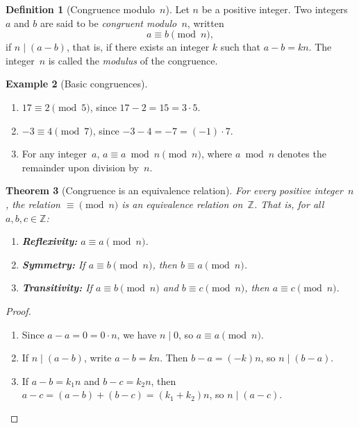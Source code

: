 \documentclass[12pt,a4paper,openany]{book}
\theoremstyle{definition}
\newtheorem{definition}{Definition}[chapter]
\newtheorem{example}[definition]{Example}
\theoremstyle{plain}
\newtheorem{theorem}[definition]{Theorem}
\theoremstyle{remark}
\newcommand{\Z}{\mathbb{Z}}
\begin{document}
\begin{definition}[Congruence modulo~$n$]
\label{def:congruence}
Let $n$ be a positive integer.  Two integers $a$ and $b$ are said to be
\emph{congruent modulo~$n$}, written
\[
  a \equiv b \pmod{n},
\]
if $n \mid (a - b)$, that is, if there exists an integer $k$ such that
$a - b = kn$.  The integer~$n$ is called the \emph{modulus}
of the congruence.
\end{definition}

\begin{example}[Basic congruences]
\label{ex:basic-cong}
\leavevmode
\begin{enumerate}[label=(\roman*)]
  \item $17 \equiv 2 \pmod{5}$, since $17 - 2 = 15 = 3 \cdot 5$.
  \item $-3 \equiv 4 \pmod{7}$, since $-3 - 4 = -7 = (-1)\cdot 7$.
  \item For any integer~$a$, $a \equiv a \bmod n \pmod{n}$, where $a \bmod n$
        denotes the remainder upon division by~$n$.
\end{enumerate}
\end{example}

\begin{theorem}[Congruence is an equivalence relation]
\label{thm:cong-equiv}
For every positive integer~$n$, the relation $\equiv \pmod{n}$ is an
equivalence relation on~$\Z$.  That is, for all $a,b,c \in \Z$:
\begin{enumerate}[label=(\roman*)]
  \item \textbf{Reflexivity:} $a \equiv a \pmod{n}$.
  \item \textbf{Symmetry:} If $a \equiv b \pmod{n}$, then $b \equiv a \pmod{n}$.
  \item \textbf{Transitivity:} If $a \equiv b \pmod{n}$ and $b \equiv c \pmod{n}$,
        then $a \equiv c \pmod{n}$.
\end{enumerate}
\end{theorem}

\begin{proof}
\leavevmode
\begin{enumerate}[label=(\roman*)]
  \item Since $a - a = 0 = 0 \cdot n$, we have $n \mid 0$, so $a \equiv a \pmod{n}$.
  \item If $n \mid (a-b)$, write $a - b = kn$.  Then $b - a = (-k)n$, so $n \mid (b-a)$.
  \item If $a - b = k_1 n$ and $b - c = k_2 n$, then
        $a - c = (a - b) + (b - c) = (k_1 + k_2)n$, so $n \mid (a - c)$.
        \qedhere
\end{enumerate}
\end{proof}
\end{document}
